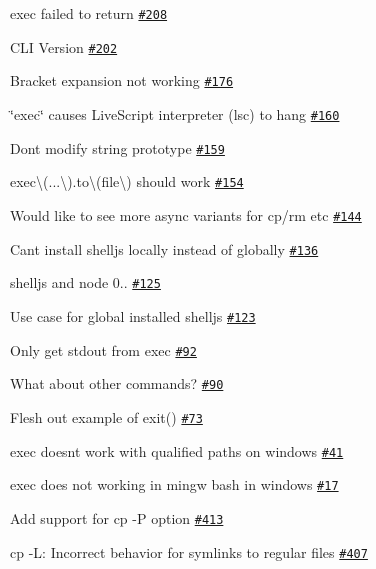 \begin{DoxyItemize}
\item exec failed to return \href{https://github.com/shelljs/shelljs/issues/208}{\tt \#208}
\item C\+LI Version \href{https://github.com/shelljs/shelljs/issues/202}{\tt \#202}
\item Bracket expansion not working \href{https://github.com/shelljs/shelljs/issues/176}{\tt \#176}
\item \char`\"{}exec\char`\"{} causes Live\+Script interpreter (lsc) to hang \href{https://github.com/shelljs/shelljs/issues/160}{\tt \#160}
\item Don\textquotesingle{}t modify string prototype \href{https://github.com/shelljs/shelljs/issues/159}{\tt \#159}
\item {\ttfamily exec\textbackslash{}(...\textbackslash{}).to\textbackslash{}(file\textbackslash{})} should work \href{https://github.com/shelljs/shelljs/issues/154}{\tt \#154}
\item Would like to see more async variants for cp/rm etc \href{https://github.com/shelljs/shelljs/issues/144}{\tt \#144}
\item Can\textquotesingle{}t install shelljs locally instead of globally \href{https://github.com/shelljs/shelljs/issues/136}{\tt \#136}
\item shelljs and node 0.. \href{https://github.com/shelljs/shelljs/issues/125}{\tt \#125}
\item Use case for global installed shelljs \href{https://github.com/shelljs/shelljs/issues/123}{\tt \#123}
\item Only get stdout from {\ttfamily exec} \href{https://github.com/shelljs/shelljs/issues/92}{\tt \#92}
\item What about other commands? \href{https://github.com/shelljs/shelljs/issues/90}{\tt \#90}
\item Flesh out example of exit() \href{https://github.com/shelljs/shelljs/issues/73}{\tt \#73}
\item exec doesn\textquotesingle{}t work with qualified paths on windows \href{https://github.com/shelljs/shelljs/issues/41}{\tt \#41}
\item exec does not working in mingw bash in windows \href{https://github.com/shelljs/shelljs/issues/17}{\tt \#17}
\item Add support for cp -\/P option \href{https://github.com/shelljs/shelljs/issues/413}{\tt \#413}
\item cp -\/L\+: Incorrect behavior for symlinks to regular files \href{https://github.com/shelljs/shelljs/issues/407}{\tt \#407}

\end{DoxyItemize}

